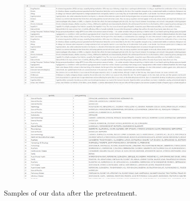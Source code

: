 \begin{figure}[h!]
  \begin{subfigure}{.60\textwidth}
      \center
      \includegraphics[width=0.95\textwidth]{images/chapter3/pretartmntData/diagnosis.PNG}
  \end{subfigure}
  \begin{subfigure}{.60\textwidth}
    \center
    \includegraphics[width=0.95\textwidth]{images/chapter3/pretartmntData/medicalrecord.PNG}
    
\end{subfigure}
\caption{Samples of our data after the pretreatment.}
\end{figure}




